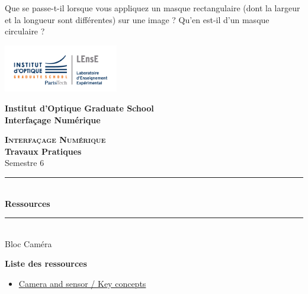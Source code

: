 \documentclass[a4paper,11pt,titlepage]{article} %
\begin{document}
\Quest Que se passe-t-il lorsque vous appliquez un masque rectangulaire (dont la largeur et la longueur sont différentes) sur une image ? Qu'en est-il d'un masque circulaire ?



\newpage
\begin{center}
	\begin{minipage}{2.5cm}
	\begin{center}
		\includegraphics[width=5cm]{images/Logo-LEnsE.png}
	\end{center}
\end{minipage}\hfill
\begin{minipage}{10cm}
	\begin{center}
	\textbf{Institut d'Optique Graduate School }\\[0.1cm]
    \textbf{Interfaçage Numérique}


	\end{center}
\end{minipage}\hfill


\vspace{2cm}


{\Large \bfseries \textsc{Interfaçage Numérique}} \\[0.5cm]
{\large \bfseries Travaux Pratiques} \\[0.2cm]
Semestre 6

\vspace{1cm}

\rule{\linewidth}{0.4mm} \\[0.4cm]
{ \Large \bfseries\color{violet_iogs} Ressources \\[0.4cm] }
\rule{\linewidth}{0.4mm} \\[1cm]
{\large Bloc Caméra}

\end{center}

\vspace{3cm}



\textbf{\large Liste des ressources}
\begin{itemize}
	\item \hyperref[doc:image_proc]{Camera and sensor / Key concepts}
\end{itemize}

\vfill

\newpage
\strut %




\end{document}
